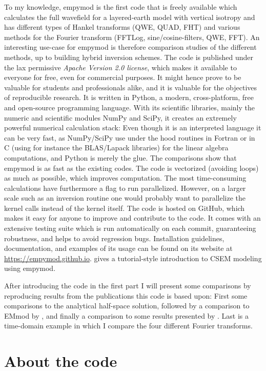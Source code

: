 \documentclass[manuscript,revised]{geophysics}
\begin{document}
To my knowledge, empymod is the first code that is freely available which
calculates the full wavefield for a layered-earth model with vertical isotropy
and has different types of Hankel transforms (QWE, QUAD, FHT) and various
methods for the Fourier transform (FFTLog, sine/cosine-filters, QWE, FFT). An
interesting use-case for empymod is therefore comparison studies of the
different methods, up to building hybrid inversion schemes. The code is
published under the lax permissive \emph{Apache Version 2.0 license}, which
makes it available to everyone for free, even for commercial purposes. It might
hence prove to be valuable for students and professionals alike, and it is
valuable for the objectives of reproducible research. It is written in Python,
a modern, cross-platform, free and open-source programming language. With its
scientific libraries, mainly the numeric and scientific modules NumPy and
SciPy, it creates an extremely powerful numerical calculation stack: Even
though it is an interpreted language it can be very fast, as NumPy/SciPy use
under the hood routines in Fortran or in C (using for instance the BLAS/Lapack
libraries) for the linear algebra computations, and Python is merely the glue.
The comparisons show that empymod is as fast as the existing codes. The code is
vectorized (avoiding loops) as much as possible, which improves computation.
The most time-consuming calculations have furthermore a flag to run
parallelized. However, on a larger scale such as an inversion routine one would
probably want to parallelize the kernel calls instead of the kernel itself. The
code is hosted on GitHub, which makes it easy for anyone to improve and
contribute to the code. It comes with an extensive testing suite which is run
automatically on each commit, guaranteeing robustness, and helps to avoid
regression bugs. Installation guidelines, documentation, and examples of its
usage can be found on its website at \url{https://empymod.github.io}.
\cite{TLE.17.Werthmuller} gives a tutorial-style introduction to CSEM modeling
using empymod.

After introducing the code in the first part I will present some comparisons by
reproducing results from the publications this code is based upon: First some
comparisons to the analytical half-space solution, followed by a comparison to
EMmod by \cite{GEO.15.Hunziker}, and finally a comparison to some results
presented by \cite{GEO.12.Key}. Last is a time-domain example in which I
compare the four different Fourier transforms.


\section{About the code}
\end{document}
